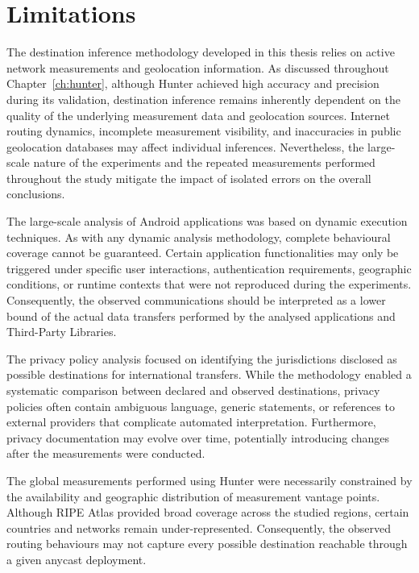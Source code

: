 \section{Limitations}
\label{sc:conclusion_limitations}

The destination inference methodology developed in this thesis relies on active network measurements and geolocation information. As discussed throughout Chapter~\ref{ch:hunter}, although Hunter achieved high accuracy and precision during its validation, destination inference remains inherently dependent on the quality of the underlying measurement data and geolocation sources. Internet routing dynamics, incomplete measurement visibility, and inaccuracies in public geolocation databases may affect individual inferences. Nevertheless, the large-scale nature of the experiments and the repeated measurements performed throughout the study mitigate the impact of isolated errors on the overall conclusions.

The large-scale analysis of Android applications was based on dynamic execution techniques. As with any dynamic analysis methodology, complete behavioural coverage cannot be guaranteed. Certain application functionalities may only be triggered under specific user interactions, authentication requirements, geographic conditions, or runtime contexts that were not reproduced during the experiments. Consequently, the observed communications should be interpreted as a lower bound of the actual data transfers performed by the analysed applications and Third-Party Libraries.

The privacy policy analysis focused on identifying the jurisdictions disclosed as possible destinations for international transfers. While the methodology enabled a systematic comparison between declared and observed destinations, privacy policies often contain ambiguous language, generic statements, or references to external providers that complicate automated interpretation. Furthermore, privacy documentation may evolve over time, potentially introducing changes after the measurements were conducted.

The global measurements performed using Hunter were necessarily constrained by the availability and geographic distribution of measurement vantage points. Although RIPE Atlas provided broad coverage across the studied regions, certain countries and networks remain under-represented. Consequently, the observed routing behaviours may not capture every possible destination reachable through a given anycast deployment.

